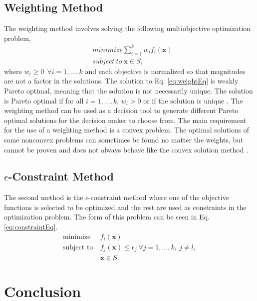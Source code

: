 \subsection{Weighting Method}
The weighting method involves solving the following multiobjective optimization problem,
\begin{equation}
\begin{aligned}
    & minimize \sum^k_{i=1} w_if_i(\mathbf{x})\\
    & subject \ to \ \mathbf{x}\in S,
\end{aligned}
\label{eq:weightEq}
\end{equation}
where $w_i\geq 0 \ \ \forall i = 1,\dots,k$ and each objective is normalized so that magnitudes are not a factor in the solutions. The solution to Eq. \ref{eq:weightEq} is weakly Pareto optimal, meaning that the solution is not necessarily unique. The solution is Pareto optimal if for all $i = 1,\dots,k$, $w_i>0$ or if the solution is unique \cite{MultOptCS}. The weighting method can be used as a decision tool to generate different Pareto optimal solutions for the decision maker to choose from. The main requirement for the use of a weighting method is a convex problem. The optimal solutions of some nonconvex problems can sometimes be found no matter the weights, but cannot be proven and does not always behave like the convex solution method \cite{MultOptCS}.\par
\subsection{$\epsilon$-Constraint Method}
The second method is the $\epsilon$-constraint method where one of the objective functions is selected to be optimized and the rest are used as constraints in the optimization problem. The form of this problem can be seen in Eq. \ref{eq:constraintEq}.
\begin{equation}
    \begin{aligned}
    \text{minimize} \ & f_i(\mathbf{x})\\
    \text{subject to} \ & f_j(\mathbf{x})\leq \epsilon_j \ \forall j = 1,\dots,k, \ j\neq l,\\
    & \mathbf{x}\in S.
    \end{aligned}
    \label{eq:constraintEq}
\end{equation}

\section{Conclusion}
